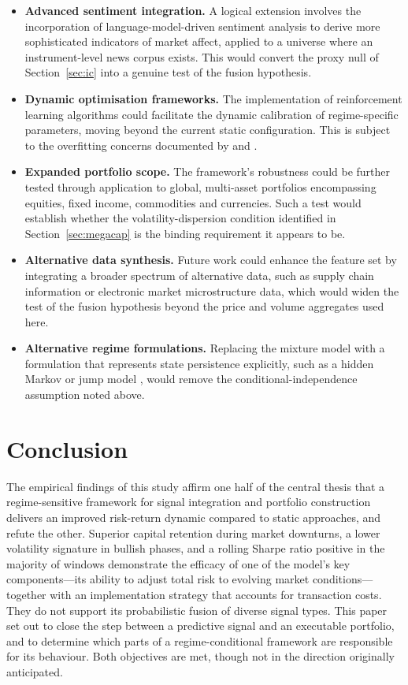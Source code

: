 \documentclass{singlecol-new}
\theoremstyle{TH}{
\newtheorem{lemma}{Lemma}
\newtheorem{theorem}[lemma]{Theorem}
\newtheorem{corrolary}[lemma]{Corrolary}
\newtheorem{conjecture}[lemma]{Conjecture}
\newtheorem{proposition}[lemma]{Proposition}
\newtheorem{claim}[lemma]{Claim}
\newtheorem{stheorem}[lemma]{Wrong Theorem}
\newtheorem{algorithm}{Algorithm}
}
\theoremstyle{THrm}{
\newtheorem{definition}{Definition}[section]
\newtheorem{question}{Question}[section]
\newtheorem{remark}{Remark}
\newtheorem{scheme}{Scheme}
}
\theoremstyle{THhit}{
\newtheorem{case}{Case}[section]
}
\begin{document}
\begin{itemize}
\item \textbf{Advanced sentiment integration.} A logical extension involves the
incorporation of language-model-driven sentiment analysis to derive more sophisticated
indicators of market affect, applied to a universe where an instrument-level news corpus
exists. This would convert the proxy null of Section~\ref{sec:ic} into a genuine test of
the fusion hypothesis.
\item \textbf{Dynamic optimisation frameworks.} The implementation of reinforcement
learning algorithms could facilitate the dynamic calibration of regime-specific
parameters, moving beyond the current static configuration. This is subject to the
overfitting concerns documented by \citet{harvey15} and \citet{prado16}.
\item \textbf{Expanded portfolio scope.} The framework's robustness could be further
tested through application to global, multi-asset portfolios encompassing equities, fixed
income, commodities and currencies. Such a test would establish whether the
volatility-dispersion condition identified in Section~\ref{sec:megacap} is the binding
requirement it appears to be.
\item \textbf{Alternative data synthesis.} Future work could enhance the feature set by
integrating a broader spectrum of alternative data, such as supply chain information or
electronic market microstructure data, which would widen the test of the fusion hypothesis
beyond the price and volume aggregates used here.
\item \textbf{Alternative regime formulations.} Replacing the mixture model with a
formulation that represents state persistence explicitly, such as a hidden Markov or jump
model \citep{li25,luo26}, would remove the conditional-independence assumption noted
above.
\end{itemize}

\section{Conclusion}
\label{sec:conclusion}

The empirical findings of this study affirm one half of the central thesis that a
regime-sensitive framework for signal integration and portfolio construction delivers an
improved risk-return dynamic compared to static approaches, and refute the other. Superior
capital retention during market downturns, a lower volatility signature in bullish phases,
and a rolling Sharpe ratio positive in the majority of windows demonstrate the efficacy of
one of the model's key components---its ability to adjust total risk to evolving market
conditions---together with an implementation strategy that accounts for transaction costs.
They do not support its probabilistic fusion of diverse signal types. This paper set out
to close the step between a predictive signal and an executable portfolio, and to
determine which parts of a regime-conditional framework are responsible for its behaviour.
Both objectives are met, though not in the direction originally anticipated.
\end{document}
